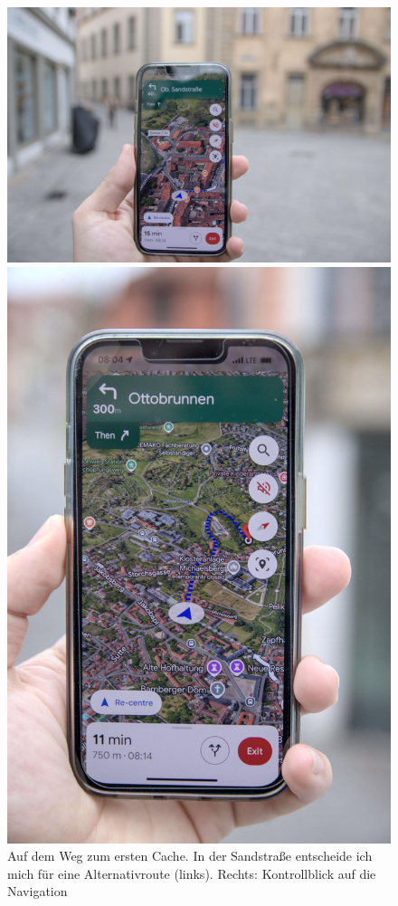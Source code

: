 \begin{figure}[h]
    \centering
    \begin{minipage}{.6\textwidth}
        \centering
        \includegraphics[width=\linewidth]{figures/geocaching/first/IMG_3087.jpg}
    \end{minipage}%
    \begin{minipage}{.4\textwidth}
        \centering
        \includegraphics[width=.7\linewidth]{figures/geocaching/first/IMG_3092.jpg}
    \end{minipage}
    \caption{Auf dem Weg zum ersten Cache. In der Sandstraße entscheide ich mich für eine Alternativroute (links). Rechts: Kontrollblick auf die Navigation}
    \label{first-cache-way}
\end{figure}

